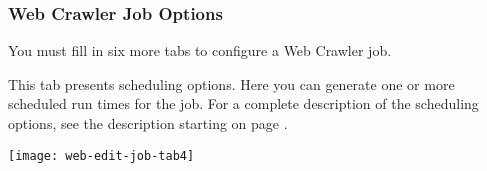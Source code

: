 %
%

\subsubsection{Web Crawler Job Options}

You must fill in six more tabs to configure a Web Crawler job.


\ifJDBCGuide

\fi

\ifCombinedConnectorGuide
This tab presents scheduling options. Here you can generate one or
more scheduled run times for the job. For a complete description of
the scheduling options, see the description starting on page
\pageref{scheduling}.
\fi

\texttt{[image: web-edit-job-tab4]}

